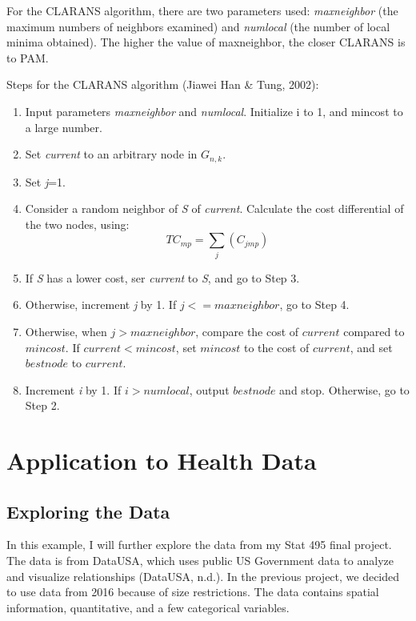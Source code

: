 \documentclass[12pt,twoside]{amherstthesis}
\providecommand{\tightlist}{%
  \setlength{\itemsep}{0pt}\setlength{\parskip}{0pt}}
\begin{document}
  For the CLARANS algorithm, there are two parameters used:
  \emph{maxneighbor} (the maximum numbers of neighbors examined) and
  \emph{numlocal} (the number of local minima obtained). The higher the
  value of maxneighbor, the closer CLARANS is to PAM.
  
  Steps for the CLARANS algorithm (Jiawei Han \& Tung, 2002):
  
  \begin{enumerate}
  \def\labelenumi{\arabic{enumi}.}
  \tightlist
  \item
    Input parameters \emph{maxneighbor} and \emph{numlocal}. Initialize i
    to 1, and mincost to a large number.
  \item
    Set \emph{current} to an arbitrary node in \(G_{n,k}\).
  \item
    Set \emph{j}=1.
  \item
    Consider a random neighbor of \emph{S} of \emph{current}. Calculate
    the cost differential of the two nodes, using:
    \[ TC_{mp} = \sum_j(C_{jmp}) \]
  \item
    If \emph{S} has a lower cost, ser \emph{current} to \emph{S}, and go
    to Step 3.
  \item
    Otherwise, increment \emph{j} by 1. If \(j <= maxneighbor\), go to
    Step 4.
  \item
    Otherwise, when \(j > maxneighbor\), compare the cost of \(current\)
    compared to \(mincost\). If \(current < mincost\), set \(mincost\) to
    the cost of \(current\), and set \(bestnode\) to \(current\).
  \item
    Increment \emph{i} by 1. If \(i> numlocal\), output \(bestnode\) and
    stop. Otherwise, go to Step 2.
  \end{enumerate}
  
  \chapter{Application to Health Data}\label{typeset-equ}
  
  \section{Exploring the Data}\label{exploring-the-data}
  
  In this example, I will further explore the data from my Stat 495 final
  project. The data is from DataUSA, which uses public US Government data
  to analyze and visualize relationships (DataUSA, n.d.). In the previous
  project, we decided to use data from 2016 because of size restrictions.
  The data contains spatial information, quantitative, and a few
  categorical variables.
  
\end{document}

